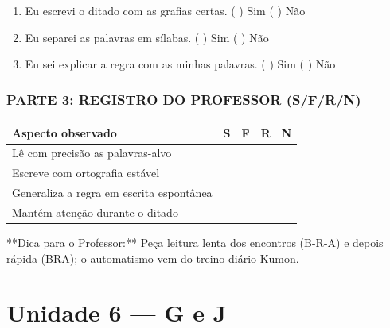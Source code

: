 \begin{exercicio}
\begin{enumerate}[label=\alph*)]
  \item Eu escrevi o ditado com as grafias certas.  \quad ( ) Sim   ( ) Não

  \item Eu separei as palavras em sílabas.  \quad ( ) Sim   ( ) Não

  \item Eu sei explicar a regra com as minhas palavras.  \quad ( ) Sim   ( ) Não

\end{enumerate}

\subsection*{PARTE 3: REGISTRO DO PROFESSOR (S/F/R/N)}

\begin{center}
\renewcommand{\arraystretch}{1.4}
\begin{tabular}{@{}p{9cm}cccc@{}}
\toprule
Aspecto observado & S & F & R & N \\
\midrule
Lê com precisão as palavras-alvo & & & & \\
Escreve com ortografia estável & & & & \\
Generaliza a regra em escrita espontânea & & & & \\
Mantém atenção durante o ditado & & & & \\
\bottomrule\end{tabular}\end{center}

\end{exercicio}

\begin{dica}
**Dica para o Professor:** Peça leitura lenta dos encontros (B-R-A) e depois rápida (BRA); o automatismo vem do treino diário Kumon.
\end{dica}



\chapter{Unidade 6 --- G e J}


